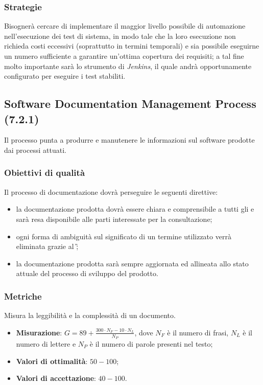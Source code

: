 \subsubsection{Strategie}
Bisognerà cercare di implementare il maggior livello possibile di automazione nell'esecuzione dei test di sistema, in modo tale che la loro esecuzione non richieda costi eccessivi (soprattutto in termini temporali) e sia possibile eseguirne un numero sufficiente a garantire un'ottima copertura dei requisiti; a tal fine molto importante sarà lo strumento di  \textit{Jenkins}, il quale andrà opportunamente configurato per eseguire i test stabiliti.
\subsection{Software Documentation Management Process (7.2.1)}
\label{soDocMgmt}
Il processo punta a produrre e manutenere le informazioni sul software prodotte dai processi attuati.
\subsubsection{Obiettivi di qualità}
Il processo di documentazione dovrà perseguire le seguenti direttive:
\begin{itemize}
\item la documentazione prodotta dovrà essere chiara e comprensibile a tutti gli  e sarà resa disponibile alle parti interessate per la consultazione;
\item ogni forma di ambiguità sul significato di un termine utilizzato verrà eliminata grazie al \G;
\item la documentazione prodotta sarà sempre aggiornata ed allineata allo stato attuale del processo di sviluppo del prodotto.
\end{itemize}
\subsubsection{Metriche}
Misura la leggibilità e la complessità di un documento.
\begin{itemize}
\item \textbf{Misurazione}: $G = 89 + \frac{300\cdot{}N_{F}-10\cdot{}N_{L}}{N_{P}}$, dove $N_{F}$ è il numero di frasi, $N_{L}$ è il numero di lettere e $N_{P}$ è il numero di parole presenti nel testo;
\item \textbf{Valori di ottimalità}: $50 - 100$;
\item \textbf{Valori di accettazione}: $40 - 100$.
\end{itemize}
